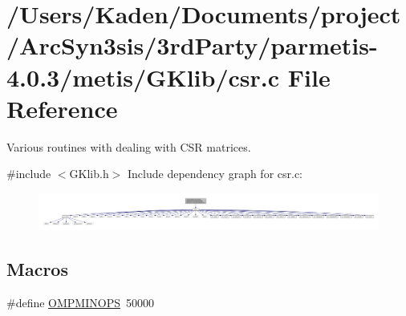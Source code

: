 \hypertarget{a00023}{}\section{/\+Users/\+Kaden/\+Documents/project/\+Arc\+Syn3sis/3rd\+Party/parmetis-\/4.0.3/metis/\+G\+Klib/csr.c File Reference}
\label{a00023}


Various routines with dealing with C\+SR matrices.  


{\ttfamily \#include $<$G\+Klib.\+h$>$}\newline
Include dependency graph for csr.\+c\+:\nopagebreak
\begin{figure}[H]
\begin{center}
\leavevmode
\includegraphics[width=350pt]{a00024}
\end{center}
\end{figure}
\subsection*{Macros}
\begin{DoxyCompactItemize}
\item 
\#define \hyperlink{a00023_afbb5013b831efde4d664bae299d7d2ee}{O\+M\+P\+M\+I\+N\+O\+PS}~50000
\end{DoxyCompactItemize}
